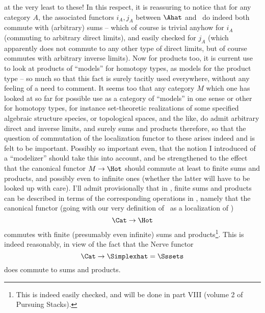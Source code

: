 at the very least to these! In this respect, it is reassuring to
notice that for any category $A$, the associated functors $i_A,j_A$
between $\Ahat$ and \Cat\ do indeed both commute with (arbitrary)
sums -- which of course is trivial anyhow for $i_A$ (commuting to
arbitrary direct limits), and easily checked for $j_A$ (which
apparently does not commute to any other type of direct limits, but of
course commutes with arbitrary inverse limits). Now for products too,
it is current use to look at products of ``models'' for homotopy
types, as models for the product type -- so much so that this fact is
surely tacitly used everywhere, without any feeling of a need to
comment. It seems too that any category $M$ which one has looked at
so far for possible use as a category of ``models'' in one sense or
other for homotopy types, for instance set-theoretic
realizations of some specified algebraic structure species, or
topological spaces, and the like, do admit arbitrary direct and
inverse limits, and surely sums and products therefore, so that the
question of commutation of the localization functor to these arises
indeed and is felt to be important. Possibly so important even, that
the notion I introduced of a ``modelizer'' should take this into
account, and be strengthened to the effect that the canonical functor
$M\to\Hot$ should commute at least to finite sums and products, and
possibly even to infinite ones (whether the latter will have to be
looked up with care). I'll admit provisionally that in \Hot, finite
sums and products can be described in terms of the corresponding
operations in \Cat, namely that the canonical functor (going with our
very definition of \Hot\ as a localization of \Cat)
\[\Cat \to \Hot\]
commutes with finite (presumably even infinite) sums and
products\footnote{This is indeed easily checked, and will be done in part VIII (volume 2 of Pursuing Stacks).}. This is indeed reasonably, in view of the fact that the
Nerve functor
\[\Cat \to \Simplexhat = \Sssets\]
does commute to sums and products.

